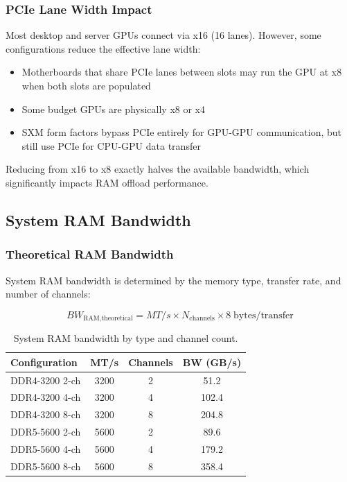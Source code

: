 \documentclass[11pt,a4paper]{article}
\theoremstyle{definition}
\begin{document}
\subsubsection{PCIe Lane Width Impact}

Most desktop and server GPUs connect via x16 (16 lanes). However, some configurations reduce the effective lane width:
\begin{itemize}
  \item Motherboards that share PCIe lanes between slots may run the GPU at x8 when both slots are populated
  \item Some budget GPUs are physically x8 or x4
  \item SXM form factors bypass PCIe entirely for GPU-GPU communication, but still use PCIe for CPU-GPU data transfer
\end{itemize}

Reducing from x16 to x8 exactly halves the available bandwidth, which significantly impacts RAM offload performance.

\subsection{System RAM Bandwidth}

\subsubsection{Theoretical RAM Bandwidth}

System RAM bandwidth is determined by the memory type, transfer rate, and number of channels:

\begin{equation}\label{eq:ram_bw}
BW_{\text{RAM,theoretical}} = MT/s \times N_{\text{channels}} \times 8 \;\text{bytes/transfer}
\end{equation}

\begin{table}[htbp]
\centering
\caption{System RAM bandwidth by type and channel count.}\label{tab:ram}
\begin{tabular}{lccc}
\toprule
\textbf{Configuration} & \textbf{MT/s} & \textbf{Channels} & \textbf{BW (GB/s)} \\
\midrule
DDR4-3200 2-ch  & 3200 & 2 & 51.2 \\
DDR4-3200 4-ch  & 3200 & 4 & 102.4 \\
DDR4-3200 8-ch  & 3200 & 8 & 204.8 \\
DDR5-5600 2-ch  & 5600 & 2 & 89.6 \\
DDR5-5600 4-ch  & 5600 & 4 & 179.2 \\
DDR5-5600 8-ch  & 5600 & 8 & 358.4 \\
\bottomrule
\end{tabular}
\end{table}
\end{document}
